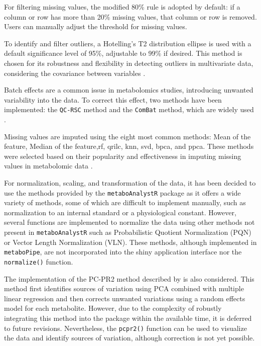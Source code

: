 \documentclass[ENG, BIB]{TFUOC}%
\begin{document}
For filtering missing values, the modified 80\% rule is adopted by default: if a column or row has more than 20\% missing values, that column or row is removed. Users can manually adjust the threshold for missing values.

To identify and filter outliers, a Hotelling's T2 distribution ellipse is used with a default significance level of 95\%, adjustable to 99\% if desired. This method is chosen for its robustness and flexibility in detecting outliers in multivariate data, considering the covariance between variables \cite{wuUsingNontargetedLCMS2021, viallonNewPipelineNormalization2021}.

Batch effects are a common issue in metabolomics studies, introducing unwanted variability into the data. To correct this effect, two methods have been implemented: the \texttt{QC-RSC} method and the \texttt{ComBat} method, which are widely used .

Missing values are imputed using the eight most common methods: Mean of the feature, Median of the feature,\gls{rf}, \gls{qrilc}, \gls{knn}, \gls{svd}, \gls{bpca}, and \gls{ppca}. These methods were selected based on their popularity and effectiveness in imputing missing values in metabolomic data \cite{weiMissingValueImputation2018,sunPretreatingNormalizingMetabolomics2024}.

For normalization, scaling, and transformation of the data, it has been decided to use the methods provided by the \texttt{metaboAnalystR} package as it offers a wide variety of methods, some of which are difficult to implement manually, such as normalization to an internal standard or a physiological constant. However, several functions are implemented to normalize the data using other methods not present in \texttt{metaboAnalystR} such as Probabilistic Quotient Normalization (PQN) or Vector Length Normalization (VLN). These methods, although implemented in \texttt{metaboPipe}, are not incorporated into the shiny application interface nor the \texttt{normalize()} function.

The implementation of the PC-PR2 method described by \citeauthor{viallonNewPipelineNormalization2021} is also considered. This method first identifies sources of variation using PCA combined with multiple linear regression and then corrects unwanted variations using a random effects model for each metabolite. However, due to the complexity of robustly integrating this method into the package within the available time, it is deferred to future revisions. Nevertheless, the \texttt{pcpr2()} function can be used to visualize the data and identify sources of variation, although correction is not yet possible.
\end{document}
